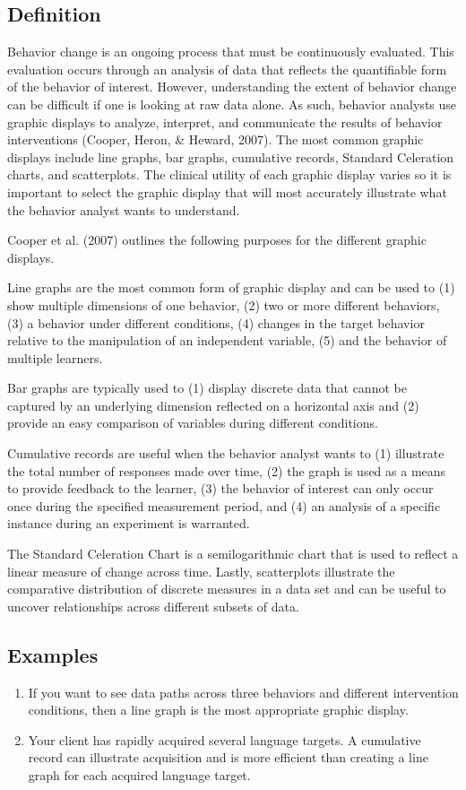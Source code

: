 \subsection{Definition}
Behavior change is an ongoing process that must be continuously evaluated.  This evaluation occurs through an analysis of data that reflects the quantifiable form of the behavior of interest.  However, understanding the extent of behavior change can be difficult if one is looking at raw data alone.  As such, behavior analysts use graphic displays to analyze, interpret, and communicate the results of behavior interventions (Cooper, Heron, \& Heward, 2007).  The most common graphic displays include line graphs, bar graphs, cumulative records, Standard Celeration charts, and scatterplots.  The clinical utility of each graphic display varies so it is important to select the graphic display that will most accurately illustrate what the behavior analyst wants to understand. 

Cooper et al. (2007) outlines the following purposes for the different graphic displays.  

Line graphs are the most common form of graphic display and can be used to (1) show multiple dimensions of one behavior, (2) two or more different behaviors, (3) a behavior under different conditions, (4) changes in the target behavior relative to the manipulation of an independent variable, (5) and the behavior of multiple learners. 

Bar graphs are typically used to (1) display discrete data that cannot be captured by an underlying dimension reflected on a horizontal axis and (2) provide an easy comparison of variables during different conditions. 

Cumulative records are useful when the behavior analyst wants to (1) illustrate the total number of responses made over time, (2) the graph is used as a means to provide feedback to the learner, (3) the behavior of interest can only occur once during the specified measurement period, and (4) an analysis of a specific instance during an experiment is warranted.

The Standard Celeration Chart is a semilogarithmic chart that is used to reflect a linear measure of change across time.  Lastly, scatterplots illustrate the comparative distribution of discrete measures in a data set and can be useful to uncover relationships across different subsets of data.
%
\subsection{Examples}
\begin{enumerate}
\item If you want to see data paths across three behaviors and different intervention conditions, then a line graph is the most appropriate graphic display.
\item Your client has rapidly acquired several language targets.  A cumulative record can illustrate acquisition and is more efficient than creating a line graph for each acquired language target.
%
\end{enumerate}
%

